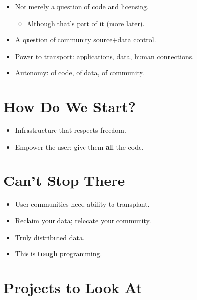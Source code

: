 \documentclass{article}
\begin{document}
\begin{itemize}
\item 
  Not merely a question of code and licensing.
  \begin{itemize}
  \item 
    Although that's part of it (more later).
  \end{itemize}
\item 
  A question of community source+data control.

\item 
  Power to transport: applications, data, human connections.

\item 
  Autonomy: of code, of data, of community.

\end{itemize}
\section{How Do We Start?}

\begin{itemize}
\item 
  Infrastructure that respects freedom.

\item 
  Empower the user: give them \textbf{all} the code.

\end{itemize}
\section{Can't Stop There}

\begin{itemize}
\item 
  User communities need ability to transplant.

\item 
  Reclaim your data; relocate your community.

\item 
  Truly distributed data.

\item 
  This is \textbf{tough} programming.

\end{itemize}
\section{Projects to Look At}
\end{document}
